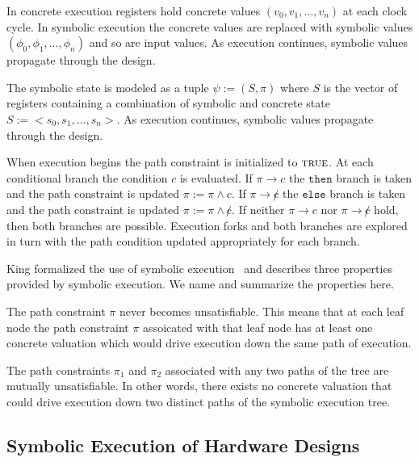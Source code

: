 In concrete execution registers hold concrete values $(v_0, v_1, \ldots, v_n)$
at each clock cycle. In symbolic execution the concrete values are replaced with
symbolic values $(\phi_0, \phi_1, \ldots, \phi_n)$ and so are input values.
As execution continues, symbolic values propagate through the design.

The symbolic state is modeled as a tuple $\psi := (S,\pi)$ where $S$ is the
vector of registers containing a combination of symbolic and concrete state $S
:= <s_0, s_1, \ldots, s_n>$. As execution continues, symbolic values propagate
through the design.

When execution begins the path constraint is initialized to $\mathtt{\textsc{true}}$. At
each conditional branch the condition $c$ is evaluated. If $\pi \rightarrow c$
the $\mathtt{then}$ branch is taken and the path constraint is
updated $\pi := \pi \wedge c$. If $\pi \rightarrow \not c$ the $\mathtt{else}$
branch is taken and the path constraint is updated $\pi := \pi \wedge \not
c$. If neither $\pi \rightarrow c$ nor $\pi \rightarrow \not c$ hold, then both
branches are possible. Execution forks and both branches are explored in turn
with the path condition updated appropriately for each branch.

King formalized the use of symbolic execution~\cite{??} and describes three
properties provided by symbolic execution. We name and summarize the properties
here.
\begin{property}
  \label{prop:kingsound}
  The path constraint $\pi$ never becomes unsatisfiable. This means that at each
  leaf node the path constraint $\pi$ assoicated with that leaf node has at
  least one concrete valuation which would drive execution down the same path of
  execution.
\end{property}
\begin{property}
  \label{prop:kingunique}
The path constraints $\pi_1$ and $\pi_2$ associated with any two paths of the
tree are mutually unsatisfiable. In other words, there exists no concrete
valuation that could drive execution down two distinct paths of the symbolic
execution tree.
\end{property}
\begin{property}[Commutativity]
\end{property}

\subsection{Symbolic Execution of Hardware Designs}

